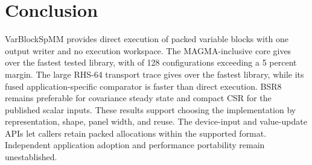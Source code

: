 \documentclass[10pt]{article}
\begin{document}
\section{Conclusion}
VarBlockSpMM provides direct execution of packed variable blocks with one
output writer and no execution workspace. The MAGMA-inclusive core gives
\RelevanceCoreRatio{} over the fastest tested library, with
\RelevanceMarginWins{} of 128 configurations exceeding a 5 percent margin.
The large RHS-64 transport trace gives \TransportLargeRatio{} over the fastest
library, while its fused application-specific comparator is
\DgFusedLarge{} faster than direct execution. BSR8 remains preferable for
covariance steady state and compact CSR for the published scalar inputs.
These results support choosing the implementation by representation, shape,
panel width, and reuse. The device-input and value-update APIs let callers
retain packed allocations within the supported format. Independent application
adoption and performance portability remain unestablished.
\end{document}
